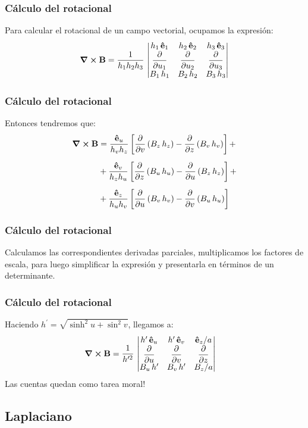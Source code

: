 \documentclass[12pt]{beamer}
\begin{document}
\begin{frame}
\frametitle{Cálculo del rotacional}
Para calcular el rotacional de un campo vectorial, ocupamos la expresión:
\pause
\begin{align*}
\curl{\vb{B}} = \dfrac{1}{h_{1} h_{2} h_{3}} \, \mdet{
h_{1} \, \vu{e}_{1} & h_{2} \, \vu{e}_{2} & h_{3} \, \vu{e}_{3} \\
\displaystyle \pdv{u_{1}} & \displaystyle \pdv{u_{2}} & \displaystyle \pdv{u_{3}} \\
B_{1} \, h_{1} & B_{2} \, h_{2} & B_{3} \, h_{3}
}
\end{align*}
\end{frame}
\begin{frame}
\frametitle{Cálculo del rotacional}
Entonces tendremos que:
\pause
\begin{align*}
\curl{\vb{B}} &= \dfrac{\vu{e}_{u}}{h_{v} h_{z}} \left[ \displaystyle \pdv{v} \left( B_{z} \, h_{z} \right) - \pdv{z} \left( B_{v} \, h_{v} \right) \right] + \\[0.5em]
&+ \dfrac{\vu{e}_{v}}{h_{z} h_{u}} \left[ \displaystyle \pdv{z} \left( B_{u} \, h_{u} \right) - \pdv{u} \left( B_{z} \, h_{z} \right) \right] + \\[0.5em]
&+ \dfrac{\vu{e}_{z}}{h_{u} h_{v}} \left[ \displaystyle \pdv{u} \left( B_{v} \, h_{v} \right) - \pdv{v} \left( B_{u} \, h_{u} \right) \right]
\end{align*}
\end{frame}
\begin{frame}
\frametitle{Cálculo del rotacional}
Calculamos las correspondientes derivadas parciales, multiplicamos los factores de escala, para luego simplificar la expresión y presentarla en términos de un determinante.
\end{frame}
\begin{frame}
\frametitle{Cálculo del rotacional}
Haciendo $h^{\prime} = \sqrt{\sinh^{2} u + \sin^{2} v}$, llegamos a:
\pause
\begin{align*}
\curl{\vb{B}} &= \dfrac{1}{h^{\prime 2}}  \, \mdet{
h^{\prime} \, \vu{e}_{u} & h^{\prime} \, \vu{e}_{v} & \vu{e}_{z} / a \\
\displaystyle \pdv{u} & \displaystyle \pdv{v} & \displaystyle \pdv{z} \\
B_{u} \, h^{\prime} & B_{v} \, h^{\prime} & B_{z} / a
}
\end{align*}
Las cuentas quedan como tarea moral!
\end{frame}

\subsection{Laplaciano}
\end{document}
